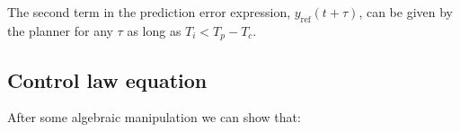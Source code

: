 \documentclass[letterpaper, 10 pt, conference]{ieeeconf}  %
\begin{document}

The second term in the prediction error expression, ${y_{\text{ref}}(t+\tau)}$, 
can be given by the planner for any $\tau$ as long as ${T_i < T_p - T_c}$.



\subsection{Control law equation}

After some algebraic manipulation we can show that:
\end{document}
